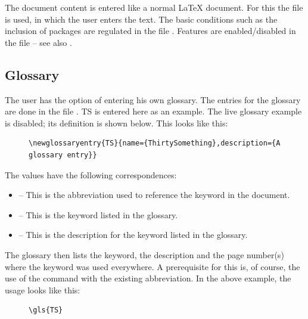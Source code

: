 The document content is entered like a normal \LaTeX{} document. For this the
file  is used, in which the user enters
the text. The basic conditions such as the inclusion of packages are regulated
in the file . Features are enabled/disabled in the
file  -- see also .

\subsection{Glossary}

The user has the option of entering his own glossary. The entries for the
glossary are done in the file .
\ifUseTsGlossary
    \gls{TS} is entered here as an example.
\else
    The live glossary example is disabled; its definition is shown below.
\fi
This looks like this:

\begin{figure}[H]
    \scriptsize
    \centering
    \begin{BVerbatim}
\newglossaryentry{TS}{name={ThirtySomething},description={A glossary entry}}
    \end{BVerbatim}
\end{figure}

The values have the following correspondences:

\begin{itemize}
    \item {} -- This is the abbreviation used to reference the
          keyword in the document.
    \item {} -- This is the keyword listed in the
          glossary.
    \item {} -- This is the description for the
          keyword listed in the glossary.
\end{itemize}

The glossary then lists the keyword, the description and the page number(s)
where the keyword was used everywhere. A prerequisite for this is, of course,
the use of the command  with
the existing abbreviation. In the above example, the usage looks like this:

\begin{figure}[H]
    \small
    \centering
    \begin{BVerbatim}
\gls{TS}
    \end{BVerbatim}
\end{figure}

